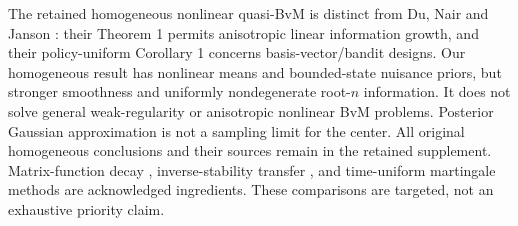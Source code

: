The retained homogeneous nonlinear quasi-BvM is distinct from Du, Nair and
Janson \cite{DNJ2025}: their Theorem 1 permits anisotropic linear information
growth, and their policy-uniform Corollary 1 concerns basis-vector/bandit designs.
Our homogeneous result has nonlinear means and bounded-state nuisance priors,
but stronger smoothness and uniformly nondegenerate root-$n$ information.
It does not solve general weak-regularity or anisotropic nonlinear BvM problems.
Posterior Gaussian approximation is not a sampling limit for the center.
All original homogeneous conclusions and their sources remain in the retained
supplement. Matrix-function decay \cite{BR2007}, inverse-stability transfer
\cite{Vollmer}, and time-uniform martingale methods \cite{Howard} are acknowledged
ingredients. These comparisons are targeted, not an exhaustive priority claim.
